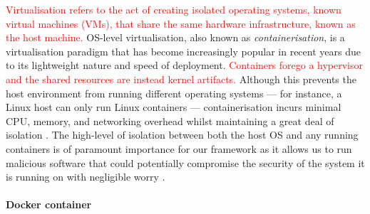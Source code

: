\documentclass[sigconf,anonymous]{acmart}\usepackage[]{graphicx}\usepackage[]{color}
\begin{document}
\textcolor{red}{Virtualisation refers to the act of creating isolated operating systems, known virtual machines (VMs), that share the same hardware infrastructure, known as the host machine.} %
OS-level virtualisation, also known as \emph{containerisation}, is a virtualisation paradigm that has become increasingly popular in recent years due to its lightweight nature and speed of deployment. \textcolor{red}{Containers forego a hypervisor and the shared resources are instead kernel artifacts.} Although this prevents the host environment from running different operating systems --- for instance, a Linux host can only run Linux containers --- containerisation incurs minimal CPU, memory, and networking overhead whilst maintaining a great deal of isolation \cite{kolyshkin2006virtualization}. The high-level of isolation between both the host OS and any running containers is of paramount importance for our framework as it allows us to run malicious software that could potentially compromise the security of the system it is running on with negligible worry \cite{reshetova2014security}.



\paragraph*{Docker container}
\end{document}
